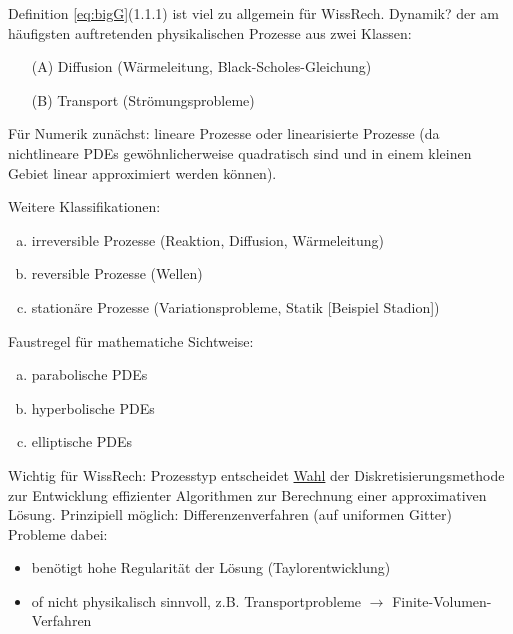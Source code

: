 Definition \eqref{eq:bigG}(1.1.1) ist viel zu allgemein für WissRech. Dynamik? der am häufigsten auftretenden physikalischen Prozesse aus zwei Klassen: 
\begin{enumerate}
    \item[(A)] Diffusion (Wärmeleitung, Black-Scholes-Gleichung)
    \item[(B)] Transport (Strömungsprobleme)
\end{enumerate}
Für Numerik zunächst: lineare Prozesse oder linearisierte Prozesse (da nichtlineare PDEs gewöhnlicherweise quadratisch sind und in einem kleinen Gebiet linear approximiert werden können).

Weitere Klassifikationen:
\begin{enumerate}[(a)]
    \item irreversible Prozesse (Reaktion, Diffusion, Wärmeleitung)
    \item reversible Prozesse (Wellen)
    \item stationäre Prozesse (Variationsprobleme, Statik [Beispiel Stadion])
\end{enumerate}

Faustregel für mathematiche Sichtweise:
\begin{enumerate}[(a) $\to$]
    \item parabolische PDEs
    \item hyperbolische PDEs
    \item elliptische PDEs
\end{enumerate}

Wichtig für WissRech: Prozesstyp entscheidet \underline{Wahl} der Diskretisierungsmethode zur Entwicklung effizienter Algorithmen zur Berechnung einer approximativen Lösung.
Prinzipiell möglich: Differenzenverfahren (auf uniformen Gitter)
Probleme dabei: 
\begin{itemize}
    \item benötigt hohe Regularität der Lösung (Taylorentwicklung)
        \item of nicht physikalisch sinnvoll, z.B. Transportprobleme $\to$ Finite-Volumen-Verfahren
\end{itemize}
